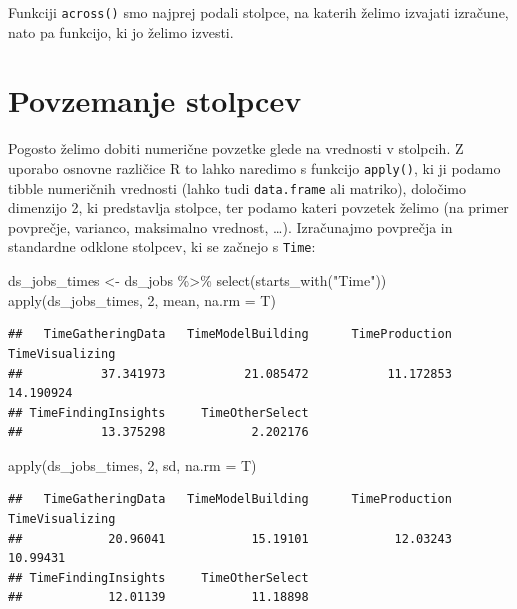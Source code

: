 \documentclass[
]{book}
\newenvironment{Shaded}{\begin{snugshade}}{\end{snugshade}}
\newcommand{\AttributeTok}[1]{\textcolor[rgb]{0.77,0.63,0.00}{#1}}
\newcommand{\DecValTok}[1]{\textcolor[rgb]{0.00,0.00,0.81}{#1}}
\newcommand{\FunctionTok}[1]{\textcolor[rgb]{0.00,0.00,0.00}{#1}}
\newcommand{\NormalTok}[1]{#1}
\newcommand{\OtherTok}[1]{\textcolor[rgb]{0.56,0.35,0.01}{#1}}
\newcommand{\SpecialCharTok}[1]{\textcolor[rgb]{0.00,0.00,0.00}{#1}}
\newcommand{\StringTok}[1]{\textcolor[rgb]{0.31,0.60,0.02}{#1}}
\begin{document}
Funkciji \texttt{across()} smo najprej podali stolpce, na katerih želimo izvajati izračune, nato pa funkcijo, ki jo želimo izvesti.

\hypertarget{povzemanje-stolpcev}{%
\section{Povzemanje stolpcev}\label{povzemanje-stolpcev}}

Pogosto želimo dobiti numerične povzetke glede na vrednosti v stolpcih. Z uporabo osnovne različice R to lahko naredimo s funkcijo \texttt{apply()}, ki ji podamo tibble numeričnih vrednosti (lahko tudi \texttt{data.frame} ali matriko), določimo dimenzijo 2, ki predstavlja stolpce, ter podamo kateri povzetek želimo (na primer povprečje, varianco, maksimalno vrednost, \ldots). Izračunajmo povprečja in standardne odklone stolpcev, ki se začnejo s \texttt{Time}:

\begin{Shaded}
\begin{Highlighting}[]
\NormalTok{ds\_jobs\_times }\OtherTok{\textless{}{-}}\NormalTok{ ds\_jobs }\SpecialCharTok{\%\textgreater{}\%}
  \FunctionTok{select}\NormalTok{(}\FunctionTok{starts\_with}\NormalTok{(}\StringTok{"Time"}\NormalTok{))}
\FunctionTok{apply}\NormalTok{(ds\_jobs\_times, }\DecValTok{2}\NormalTok{, mean, }\AttributeTok{na.rm =}\NormalTok{ T)}
\end{Highlighting}
\end{Shaded}

\begin{verbatim}
##   TimeGatheringData   TimeModelBuilding      TimeProduction     TimeVisualizing 
##           37.341973           21.085472           11.172853           14.190924 
## TimeFindingInsights     TimeOtherSelect 
##           13.375298            2.202176
\end{verbatim}

\begin{Shaded}
\begin{Highlighting}[]
\FunctionTok{apply}\NormalTok{(ds\_jobs\_times, }\DecValTok{2}\NormalTok{, sd, }\AttributeTok{na.rm =}\NormalTok{ T)}
\end{Highlighting}
\end{Shaded}

\begin{verbatim}
##   TimeGatheringData   TimeModelBuilding      TimeProduction     TimeVisualizing 
##            20.96041            15.19101            12.03243            10.99431 
## TimeFindingInsights     TimeOtherSelect 
##            12.01139            11.18898
\end{verbatim}
\end{document}
